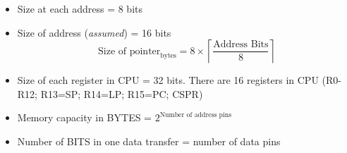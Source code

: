 \begin{itemize}
    \item Size at each address = 8 bits
    \item Size of address (\textit{assumed}) = 16 bits
    \[
    \text{Size of pointer}_{\text{bytes}} = 8 \times \left\lceil \frac{\text{Address Bits}}{8} \right\rceil
    \]
    \item Size of each register in CPU = 32 bits.\newline
    There are 16 registers in CPU (R0-R12; R13=SP; R14=LP; R15=PC; CSPR)
    \item Memory capacity in BYTES = $2^{\text{Number of address pins}}$
    \item Number of BITS in one data transfer = number of data pins
\end{itemize}
